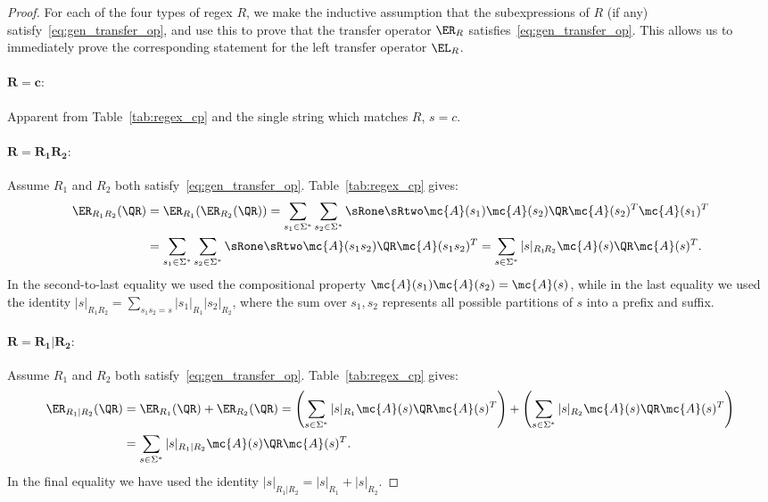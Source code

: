 \begin{proof}

For each of the four types of regex $R$, we make the inductive assumption that the subexpressions of $R$ (if any) satisfy~\eqref{eq:gen_transfer_op}, and use this to prove that the transfer operator $\ER_R$ satisfies~\eqref{eq:gen_transfer_op}. This allows us to immediately prove the corresponding statement for the left transfer operator $\EL_R$.

\paragraph{$\mathbf{R = c:}$} Apparent from Table~\ref{tab:regex_cp} 
and the single string which matches $R$, $s = c$.
   
\paragraph{$\mathbf{R = R_1 R_2:}$} Assume $R_1$ and $R_2$ both satisfy~\eqref{eq:gen_transfer_op}. Table~\ref{tab:regex_cp} 
gives:
%
\begin{align*}
    \ER_{R_1 R_2}(\QR) &= \ER_{R_1}(\ER_{R_2}(\QR)) = \sum_{s_1 \in \Sigma^*} \sum_{s_2 \in \Sigma^*} \sRone \sRtwo \mc{A}(s_1) \mc{A}(s_2) \QR \mc{A}(s_2)^T \mc{A}(s_1)^T \\
    &= \sum_{s_1 \in \Sigma^*} \sum_{s_2 \in \Sigma^*} \sRone \sRtwo \mc{A}(s_1 s_2) \QR \mc{A}(s_1 s_2)^T = \sum_{s \in \Sigma^*} |s|_{R_1\! R_2} \mc{A}(s) \QR \mc{A}(s)^T.
\end{align*}
%
In the second-to-last equality we used the compositional property $\mc{A}(s_1)\mc{A}(s_2) = \mc{A}(s)$, while in the last equality we used the identity $|s|_{R_1 R_2} = \sum_{s_1 s_2 = s} |s_1|_{R_1} |s_2|_{R_2}$, where the sum over $s_1, s_2$ represents all possible partitions of $s$ into a prefix and suffix.

\paragraph{$\mathbf{R = R_1 | R_2:}$} Assume $R_1$ and $R_2$ both satisfy~\eqref{eq:gen_transfer_op}. Table~\ref{tab:regex_cp} 
gives:
%
\begin{align*}
    \ER_{R_1 | R_2}(\QR) &= \ER_{R_1}(\QR) + \ER_{R_2}(\QR) = \left(\sum_{s \in \Sigma^*} |s|_{R_1} \mc{A}(s) \QR \mc{A}(s)^T\right) + \left(\sum_{s \in \Sigma^*} |s|_{R_2} \mc{A}(s) \QR \mc{A}(s)^T\right) \\
    &= \sum_{s \in \Sigma^*} |s|_{R_1 | R_2} \mc{A}(s) \QR \mc{A}(s)^T.
\end{align*}
%
In the final equality we have used the identity $|s|_{R_1 | R_2} = |s|_{R_1} + |s|_{R_2}$.
   

\end{proof}
